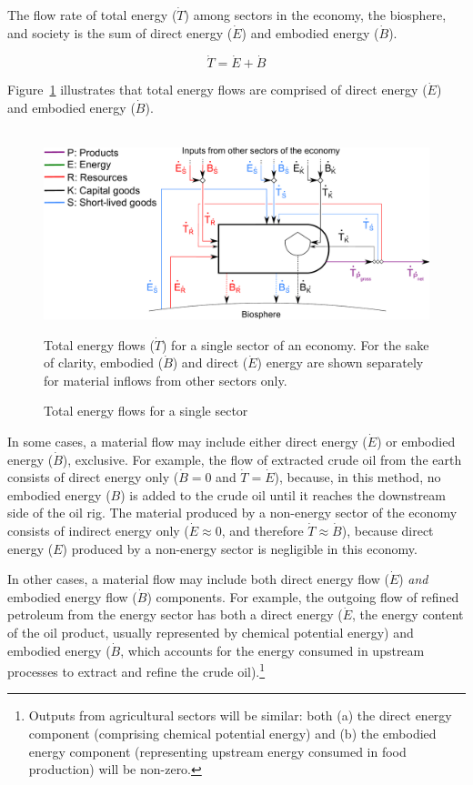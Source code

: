 The flow rate of total energy 
($\dot{T}$)
among sectors in 
the economy, the biosphere, and society is the sum of
direct energy ($\dot{E}$) and embodied 
energy ($\dot{B}$).

\begin{equation} \label{eq:T_dot_def}
	\dot{T} = \dot{E} + \dot{B}
\end{equation}

\noindent Figure~\ref{fig:embodied_single_producer} illustrates
that total energy flows are comprised of
direct energy ($\dot{E}$) and embodied energy ($\dot{B}$). 

\begin{figure}[!ht]
	\centering\
	\includegraphics[width=.9\textwidth]{Part_1/Chapter_Embodied/images/PERKS_basic_unit_embodied_energy_content.pdf}
	\caption{Total energy flows for a single sector}{Total energy flows 
	($\dot{T}$) for a single sector of an economy. 
	For the sake of clarity, 
	embodied ($\dot{B}$) and direct ($\dot{E}$) energy
	are shown separately for material inflows from other sectors only.}
\label{fig:embodied_single_producer}
\end{figure}

In some cases, a material flow may include 
either direct energy ($\dot{E}$) 
or embodied energy ($\dot{B}$), exclusive. 
For example, the flow of extracted crude oil from the earth 
consists of direct energy only ($\dot{B} = 0$ and $\dot{T} = \dot{E}$), 
because, in this method, no embodied energy ($B$) is added 
to the crude oil until it reaches the downstream side of the oil rig.
The material produced by a non-energy sector of the economy 
consists of indirect energy only ($\dot{E} \approx 0$, 
and therefore $\dot{T} \approx \dot{B}$), 
because direct energy ($E$) produced by 
a non-energy sector is negligible in this economy. 

In other cases, a material flow may include both direct energy flow
($\dot{E}$) \emph{and} embodied energy flow ($\dot{B}$) components.
For example, the outgoing flow of refined petroleum from the energy sector 
has both a direct energy ($\dot{E}$, the energy content of the oil product, 
usually represented by chemical potential energy) 
and embodied energy ($\dot{B}$, which accounts for the energy 
consumed in upstream processes 
to extract and refine the crude oil).\footnote{Outputs from 
agricultural sectors will be similar: 
both (a) the direct energy component (comprising chemical potential energy) 
and (b) the embodied energy component (representing upstream
energy consumed in food production) will be non-zero.}

